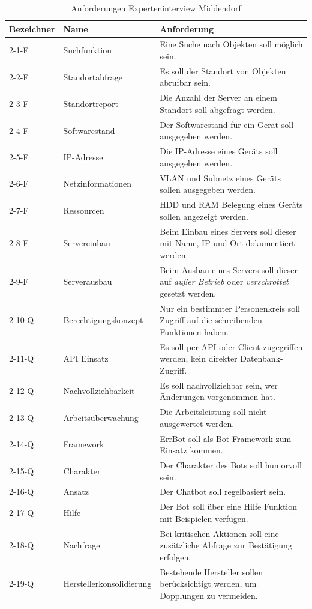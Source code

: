 \begin{table}[H]
\centering
\begin{tabularx}{1\textwidth}{l|l|X}
  Bezeichner & Name                 & Anforderung \\\hline
  2-1-F  & Suchfunktion             & Eine Suche nach Objekten soll möglich sein. \\
  2-2-F  & Standortabfrage          & Es soll der Standort von Objekten abrufbar sein. \\
  2-3-F  & Standortreport           & Die Anzahl der Server an einem Standort soll abgefragt werden. \\
  2-4-F  & Softwarestand            & Der Softwarestand für ein Gerät soll ausgegeben werden. \\
  2-5-F  & IP-Adresse               & Die IP-Adresse eines Geräts soll ausgegeben werden. \\
  2-6-F  & Netzinformationen        & VLAN und Subnetz eines Geräts sollen ausgegeben werden. \\
  2-7-F  & Ressourcen               & HDD und RAM Belegung eines Geräts sollen angezeigt werden. \\
  2-8-F  & Servereinbau             & Beim Einbau eines Servers soll dieser mit Name, IP und Ort dokumentiert werden. \\
  2-9-F  & Serverausbau             & Beim Ausbau eines Servers soll dieser auf \textit{außer Betrieb} oder \textit{verschrottet} gesetzt werden. \\
  2-10-Q & Berechtigungskonzept     & Nur ein bestimmter Personenkreis soll Zugriff auf die schreibenden Funktionen haben. \\
  2-11-Q & API Einsatz              & Es soll per API oder Client zugegriffen werden, kein direkter Datenbank-Zugriff.\\
  2-12-Q & Nachvollziehbarkeit      & Es soll nachvollziehbar sein, wer Änderungen vorgenommen hat. \\
  2-13-Q & Arbeitsüberwachung      & Die Arbeitsleistung soll nicht ausgewertet werden. \\
  2-14-Q & Framework                & ErrBot soll als Bot Framework zum Einsatz kommen. \\
  2-15-Q & Charakter                & Der Charakter des Bots soll humorvoll sein. \\
  2-16-Q & Ansatz                   & Der Chatbot soll regelbasiert sein. \\
  2-17-Q & Hilfe                    & Der Bot soll über eine Hilfe Funktion mit Beispielen verfügen. \\
  2-18-Q & Nachfrage                & Bei kritischen Aktionen soll eine zusätzliche Abfrage zur Bestätigung erfolgen. \\
  2-19-Q & Herstellerkonsolidierung & Bestehende Hersteller sollen berücksichtigt werden, um Dopplungen zu vermeiden. \\
\end{tabularx}
\\\eigen
\caption{Anforderungen Experteninterview Middendorf}
\label{tab:expmidd}
\end{table}

